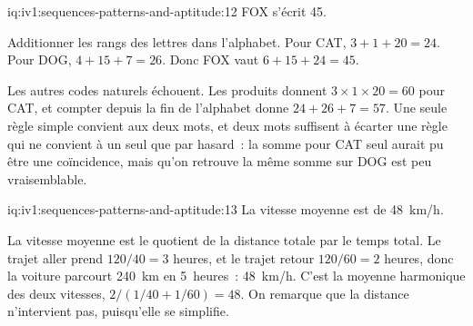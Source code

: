 \begin{solution}{iq:iv1:sequences-patterns-and-aptitude:12}
FOX s'écrit 45.

Additionner les rangs des lettres dans l'alphabet. Pour CAT, $3 + 1 + 20 = 24$. Pour DOG, $4 + 15 + 7 = 26$. Donc FOX vaut $6 + 15 + 24 = 45$.

Les autres codes naturels échouent. Les produits donnent $3 \times 1 \times 20 = 60$ pour CAT, et compter depuis la fin de l'alphabet donne $24 + 26 + 7 = 57$. Une seule règle simple convient aux deux mots, et deux mots suffisent à écarter une règle qui ne convient à un seul que par hasard~: la somme pour CAT seul aurait pu être une coïncidence, mais qu'on retrouve la même somme sur DOG est peu vraisemblable.

\end{solution}

\begin{solution}{iq:iv1:sequences-patterns-and-aptitude:13}
La vitesse moyenne est de 48~km/h.

La vitesse moyenne est le quotient de la distance totale par le temps total. Le trajet aller prend $120/40 = 3$ heures, et le trajet retour $120/60 = 2$ heures, donc la voiture parcourt 240~km en 5~heures~: 48~km/h. C'est la moyenne harmonique des deux vitesses, $2/(1/40 + 1/60) = 48$. On remarque que la distance n'intervient pas, puisqu'elle se simplifie.

\end{solution}

